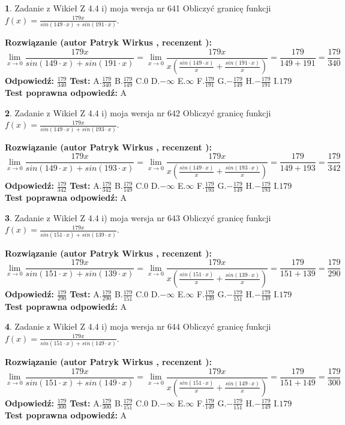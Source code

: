 \documentclass[12pt, a4paper]{article}
\theoremstyle{definition} %
\newtheorem{zad}{}
\newcommand{\zadStart}[1]{\begin{zad}#1\newline}
\newcommand{\zadStop}{\end{zad}}
\newcommand{\rozwStart}[2]{\noindent \textbf{Rozwiązanie (autor #1 , recenzent #2): }\newline}
\newcommand{\rozwStop}{\newline}
\newcommand{\odpStart}{\noindent \textbf{Odpowiedź:}\newline}
\newcommand{\odpStop}{\newline}
\newcommand{\testStart}{\noindent \textbf{Test:}\newline}
\newcommand{\testStop}{\newline}
\newcommand{\kluczStart}{\noindent \textbf{Test poprawna odpowiedź:}\newline}
\newcommand{\kluczStop}{\newline}
\begin{document}
\zadStart{Zadanie z Wikieł Z 4.4 i) moja wersja nr 641}
Obliczyć granicę funkcji $f(x)=\frac{179x}{sin(149\cdot x) +sin(191\cdot x)}$.
\zadStop
\rozwStart{Patryk Wirkus}{}
$$\lim\limits_{x\to 0}\frac{179x}{sin(149\cdot x) +sin(191\cdot x)}=\lim\limits_{x\to 0}\frac{179x}{x(\frac{sin(149\cdot x)}{x}+\frac{sin(191\cdot x)}{x})}=\frac{179}{149+191} = \frac{179}{340}$$
\rozwStop
\odpStart
$\frac{179}{340}$
\odpStop
\testStart
A.$\frac{179}{340}$
B.$\frac{179}{149}$
C.$0$
D.$-\infty$
E.$\infty$
F.$\frac{179}{191}$
G.$-\frac{179}{149}$
H.$-\frac{179}{191}$
I.$179$
\testStop
\kluczStart
A
\kluczStop



\zadStart{Zadanie z Wikieł Z 4.4 i) moja wersja nr 642}
Obliczyć granicę funkcji $f(x)=\frac{179x}{sin(149\cdot x) +sin(193\cdot x)}$.
\zadStop
\rozwStart{Patryk Wirkus}{}
$$\lim\limits_{x\to 0}\frac{179x}{sin(149\cdot x) +sin(193\cdot x)}=\lim\limits_{x\to 0}\frac{179x}{x(\frac{sin(149\cdot x)}{x}+\frac{sin(193\cdot x)}{x})}=\frac{179}{149+193} = \frac{179}{342}$$
\rozwStop
\odpStart
$\frac{179}{342}$
\odpStop
\testStart
A.$\frac{179}{342}$
B.$\frac{179}{149}$
C.$0$
D.$-\infty$
E.$\infty$
F.$\frac{179}{193}$
G.$-\frac{179}{149}$
H.$-\frac{179}{193}$
I.$179$
\testStop
\kluczStart
A
\kluczStop



\zadStart{Zadanie z Wikieł Z 4.4 i) moja wersja nr 643}
Obliczyć granicę funkcji $f(x)=\frac{179x}{sin(151\cdot x) +sin(139\cdot x)}$.
\zadStop
\rozwStart{Patryk Wirkus}{}
$$\lim\limits_{x\to 0}\frac{179x}{sin(151\cdot x) +sin(139\cdot x)}=\lim\limits_{x\to 0}\frac{179x}{x(\frac{sin(151\cdot x)}{x}+\frac{sin(139\cdot x)}{x})}=\frac{179}{151+139} = \frac{179}{290}$$
\rozwStop
\odpStart
$\frac{179}{290}$
\odpStop
\testStart
A.$\frac{179}{290}$
B.$\frac{179}{151}$
C.$0$
D.$-\infty$
E.$\infty$
F.$\frac{179}{139}$
G.$-\frac{179}{151}$
H.$-\frac{179}{139}$
I.$179$
\testStop
\kluczStart
A
\kluczStop



\zadStart{Zadanie z Wikieł Z 4.4 i) moja wersja nr 644}
Obliczyć granicę funkcji $f(x)=\frac{179x}{sin(151\cdot x) +sin(149\cdot x)}$.
\zadStop
\rozwStart{Patryk Wirkus}{}
$$\lim\limits_{x\to 0}\frac{179x}{sin(151\cdot x) +sin(149\cdot x)}=\lim\limits_{x\to 0}\frac{179x}{x(\frac{sin(151\cdot x)}{x}+\frac{sin(149\cdot x)}{x})}=\frac{179}{151+149} = \frac{179}{300}$$
\rozwStop
\odpStart
$\frac{179}{300}$
\odpStop
\testStart
A.$\frac{179}{300}$
B.$\frac{179}{151}$
C.$0$
D.$-\infty$
E.$\infty$
F.$\frac{179}{149}$
G.$-\frac{179}{151}$
H.$-\frac{179}{149}$
I.$179$
\testStop
\kluczStart
A
\kluczStop
\end{document}
